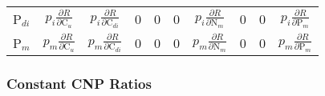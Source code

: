\documentclass[12pt, a4paper]{article}
\begin{document}
\begin{table}[hb]
{\begin{tabular}{ c | ccccccccc }
  P$_{di}$    &
  $p_i\frac{\partial R}{\partial \text{C}_u} $  & 
  $p_i\frac{\partial R}{\partial \text{C}_{di}}$  & 
  0 & 
  0 &
  0&
  $p_i\frac{\partial R}{\partial \text{N}_m}$& 
  0  & 
  0 & 
  $p_i \frac{\partial R}{\partial \text{P}_m}$\\
  
  P$_m$    &
  $p_m \frac{\partial R}{\partial \text{C}_u}$  & 
  $p_m\frac{\partial R}{\partial \text{C}_{di}} $  & 
  0 &
  0 &
  0& 
  $p_m\frac{\partial R}{\partial \text{N}_m} $ & 
  0   & 
  0 & 
  $p_m\frac{\partial R}{\partial \text{P}_m} $ \\
  \end{tabular}
  }
\end{table}

\clearpage


\subsubsection{Constant CNP Ratios}
\end{document}
